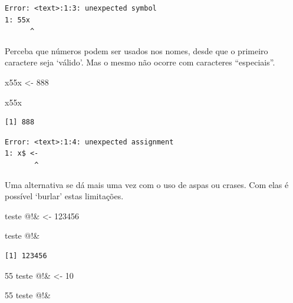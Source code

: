 \documentclass[
  letterpaper,
  DIV=11,
  numbers=noendperiod]{scrreprt}
\newenvironment{Shaded}{\begin{snugshade}}{\end{snugshade}}
\newcommand{\AttributeTok}[1]{\textcolor[rgb]{0.40,0.45,0.13}{#1}}
\newcommand{\DecValTok}[1]{\textcolor[rgb]{0.68,0.00,0.00}{#1}}
\newcommand{\ErrorTok}[1]{\textcolor[rgb]{0.68,0.00,0.00}{#1}}
\newcommand{\NormalTok}[1]{\textcolor[rgb]{0.00,0.23,0.31}{#1}}
\newcommand{\OtherTok}[1]{\textcolor[rgb]{0.00,0.23,0.31}{#1}}
\newcommand{\SpecialCharTok}[1]{\textcolor[rgb]{0.37,0.37,0.37}{#1}}
\newcommand{\StringTok}[1]{\textcolor[rgb]{0.13,0.47,0.30}{#1}}
\begin{document}
\begin{verbatim}
Error: <text>:1:3: unexpected symbol
1: 55x
      ^
\end{verbatim}

Perceba que números podem ser usados nos nomes, desde que o primeiro
caractere seja `válido'. Mas o mesmo não ocorre com caracteres
``especiais''.

\begin{Shaded}
\begin{Highlighting}[]
\NormalTok{x55x }\OtherTok{\textless{}{-}} \DecValTok{888}

\NormalTok{x55x}
\end{Highlighting}
\end{Shaded}

\begin{verbatim}
[1] 888
\end{verbatim}

\begin{Shaded}
\end{Shaded}

\begin{verbatim}
Error: <text>:1:4: unexpected assignment
1: x$ <-
       ^
\end{verbatim}

Uma alternativa se dá mais uma vez com o uso de aspas ou crases. Com
elas é possível `burlar' estas limitações.

\begin{Shaded}
\begin{Highlighting}[]
\StringTok{\textasciigrave{}}\AttributeTok{teste @!\&}\StringTok{\textasciigrave{}} \OtherTok{\textless{}{-}} \DecValTok{123456}

\StringTok{\textasciigrave{}}\AttributeTok{teste @!\&}\StringTok{\textasciigrave{}}
\end{Highlighting}
\end{Shaded}

\begin{verbatim}
[1] 123456
\end{verbatim}

\begin{Shaded}
\begin{Highlighting}[]
\StringTok{\textquotesingle{}55 teste @!\&\textquotesingle{}} \OtherTok{\textless{}{-}} \DecValTok{10}

\StringTok{\textasciigrave{}}\AttributeTok{55 teste @!\&}\StringTok{\textasciigrave{}}
\end{Highlighting}
\end{Shaded}
\end{document}
